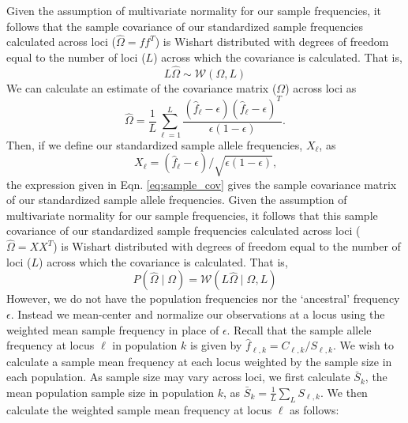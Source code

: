 \documentclass[12pt]{article}
\begin{document}
Given the assumption of multivariate normality for our sample frequencies, it follows that the sample covariance of our standardized sample frequencies calculated across loci ($\widehat{\Omega} = f f^T$)  is Wishart distributed with degrees of freedom equal to the number of loci ($L$) across which the covariance is calculated.
That is, 
%
\begin{equation}
L \widehat{\Omega} \sim \mathcal{W}\left( \Omega, L	\right)
\end{equation}
%
We can calculate an estimate of the covariance matrix ($\Omega$) across loci as 
%
\begin{equation}
\widehat{\Omega} = \frac{1}{L} \sum_{\ell=1}^{L} \frac{(\hat{f}_{\ell}  - \epsilon) (\hat{f}_{\ell}  - \epsilon)^T}{\epsilon(1-\epsilon)} \text{.}
\end{equation}
%
Then, if we define our standardized sample allele frequencies, $X_\ell$, as
%
\begin{equation}
X_\ell = (\hat{f}_{\ell}  - \epsilon)/\sqrt{\epsilon(1-\epsilon)}\text{,}
\end{equation}
%
the expression given in Eqn. \eqref{eq:sample_cov} gives the sample covariance matrix of our standardized sample allele frequencies.
Given the assumption of multivariate normality for our sample frequencies, it follows that this sample covariance of our standardized sample frequencies calculated across loci ($\widehat{\Omega} = X X^T$)  is Wishart distributed with degrees of freedom equal to the number of loci ($L$) across which the covariance is calculated.
That is, 
%
\begin{equation}
P(\widehat{\Omega} \mid \Omega) = \mathcal{W}\left(L \widehat{\Omega} \mid  \Omega,L \right)
\end{equation}
%
However, we do not have the population frequencies nor the `ancestral' frequency $\epsilon$. Instead we mean-center and normalize our observations at a locus using the weighted mean sample frequency in place of $\epsilon$.  Recall that the sample allele frequency at locus $\ell$ in population $k$ is given by $\hat{f}_{\ell,k} = C_{\ell,k}/S_{\ell,k}$.  We wish to calculate a sample mean frequency at each locus weighted by the sample size in each population.  As sample size may vary across loci, we first calculate $\bar{S}_k$, the mean population sample size in population $k$, as $\bar{S}_k = \frac{1}{L}\sum_L S_{\ell,k}$.  We then calculate the weighted sample mean frequency at locus $\ell$ as follows:
\end{document}
